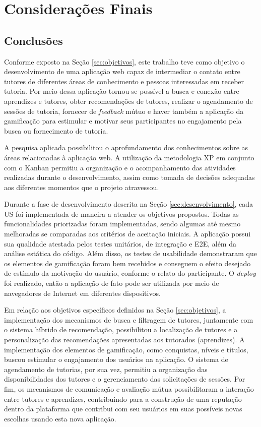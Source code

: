 \chapter[Considerações Finais]{Considerações Finais}
\label{cap:consideracoes}

\section[Conclusões]{Conclusões}

Conforme exposto na Seção \ref{sec:objetivos}, este trabalho teve como objetivo o desenvolvimento de uma aplicação web capaz de intermediar o contato entre tutores de diferentes áreas de conhecimento e pessoas interessadas em receber tutoria. Por meio dessa aplicação tornou-se possível a busca e conexão entre aprendizes e tutores, obter recomendações de tutores, realizar o agendamento de sessões de tutoria, fornecer de \textit{feedback} mútuo e haver também a aplicação da gamificação para estimular e motivar seus participantes no engajamento pela busca ou fornecimento de tutoria.

A pesquisa aplicada possibilitou o aprofundamento dos conhecimentos sobre as áreas relacionadas à aplicação web. A utilização da metodologia XP em conjunto com o Kanban permitiu a organização e o acompanhamento das atividades realizadas durante o desenvolvimento,  assim como tomada de decisões adequadas aos diferentes momentos que o projeto atravessou.

Durante a fase de desenvolvimento descrita na Seção \ref{sec:desenvolvimento}, cada US foi implementada de maneira a atender os objetivos propostos. Todas as funcionalidades priorizadas foram implementadas, sendo algumas até mesmo melhoradas se comparadas aos critérios de aceitação iniciais. A aplicação possui sua qualidade atestada pelos testes unitários, de integração e E2E, além da análise estática do código. Além disso, os testes de usabilidade demonstraram que os elementos de gamificação foram bem recebidos e conseguem o efeito desejado de estímulo da motivação do usuário, conforme o relato do participante. O \textit{deploy} foi realizado, então a aplicação de fato pode ser utilizada por meio de navegadores de Internet em diferentes dispositivos.

Em relação aos objetivos específicos definidos na Seção \ref{sec:objetivos}, a implementação dos mecanismos de busca e filtragem de tutores, juntamente com o sistema híbrido de recomendação, possibilitou a localização de tutores e a personalização das recomendações apresentadas aos tutorados (aprendizes). A implementação dos elementos de gamificação, como conquistas, níveis e títulos, buscou estimular o engajamento dos usuários na aplicação. O sistema de agendamento de tutorias, por sua vez, permitiu a organização das disponibilidades dos tutores e o gerenciamento das solicitações de sessões. Por fim, os mecanismos de comunicação e avaliação mútua possibilitaram a interação entre tutores e aprendizes, contribuindo para a construção de uma reputação dentro da plataforma que contribui com seu usuários em suas possíveis novas escolhas usando esta nova aplicação.


